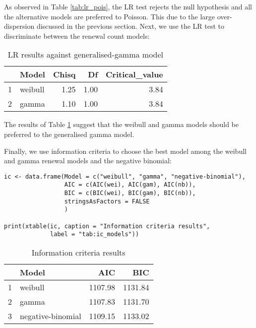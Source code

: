 \documentclass[a4paper,twoside,11pt]{article}
\begin{document}
As observed in Table \ref{tab:lr_pois}, the LR test rejects the null
hypothesis and all the alternative models are preferred to Poisson. This due to
the large over-dispersion discussed in the previous section. Next, we use the LR
test to discriminate between the renewal count models:
\begin{table}[ht]
\centering
\begin{tabular}{rlrrr}
  \hline
 & Model & Chisq & Df & Critical\_value \\ 
  \hline
1 & weibull & 1.25 & 1.00 & 3.84 \\ 
  2 & gamma & 1.10 & 1.00 & 3.84 \\ 
   \hline
\end{tabular}
\caption{LR results against generalised-gamma model} 
\label{tab:lr_gengam}
\end{table}

The results of Table \ref{tab:lr_gengam} suggest that the weibull and gamma models
should be preferred to the generalised gamma model.

Finally, we use information criteria to choose the best model among the weibull
and gamma renewal models and the negative binomial:
\begin{verbatim}
ic <- data.frame(Model = c("weibull", "gamma", "negative-binomial"),
                 AIC = c(AIC(wei), AIC(gam), AIC(nb)),
                 BIC = c(BIC(wei), BIC(gam), BIC(nb)),
                 stringsAsFactors = FALSE                    
                 )                  
                         
print(xtable(ic, caption = "Information criteria results", 
             label = "tab:ic_models"))                        
\end{verbatim}

\begin{table}[ht]
\centering
\begin{tabular}{rlrr}
  \hline
 & Model & AIC & BIC \\ 
  \hline
1 & weibull & 1107.98 & 1131.84 \\ 
  2 & gamma & 1107.83 & 1131.70 \\ 
  3 & negative-binomial & 1109.15 & 1133.02 \\ 
   \hline
\end{tabular}
\caption{Information criteria results} 
\label{tab:ic_models}
\end{table}
\end{document}
